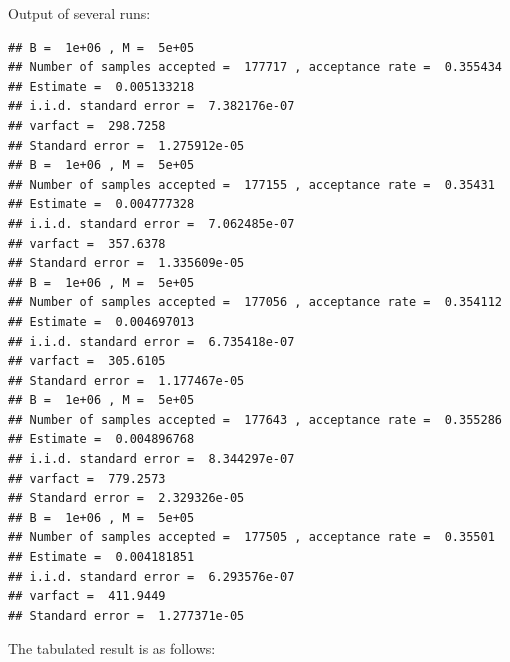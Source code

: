 \begin{knitrout}
\begin{kframe}
\begin{alltt}
\hlstd{(}\hlstd{)}
\hlstd{(}\hlstd{)}
\hlstd{(}\hlstd{)}
\hlstd{(}\hlstd{)}
\hlstd{(}\hlstd{)}
\hlstd{(}\hlstd{)}
\end{alltt}
\end{kframe}
\end{knitrout}
Output of several runs:
\begin{knitrout}
\color{fgcolor}\begin{kframe}
\begin{verbatim}
## B =  1e+06 , M =  5e+05 
## Number of samples accepted =  177717 , acceptance rate =  0.355434 
## Estimate =  0.005133218 
## i.i.d. standard error =  7.382176e-07 
## varfact =  298.7258 
## Standard error =  1.275912e-05
## B =  1e+06 , M =  5e+05 
## Number of samples accepted =  177155 , acceptance rate =  0.35431 
## Estimate =  0.004777328 
## i.i.d. standard error =  7.062485e-07 
## varfact =  357.6378 
## Standard error =  1.335609e-05
## B =  1e+06 , M =  5e+05 
## Number of samples accepted =  177056 , acceptance rate =  0.354112 
## Estimate =  0.004697013 
## i.i.d. standard error =  6.735418e-07 
## varfact =  305.6105 
## Standard error =  1.177467e-05
## B =  1e+06 , M =  5e+05 
## Number of samples accepted =  177643 , acceptance rate =  0.355286 
## Estimate =  0.004896768 
## i.i.d. standard error =  8.344297e-07 
## varfact =  779.2573 
## Standard error =  2.329326e-05
## B =  1e+06 , M =  5e+05 
## Number of samples accepted =  177505 , acceptance rate =  0.35501 
## Estimate =  0.004181851 
## i.i.d. standard error =  6.293576e-07 
## varfact =  411.9449 
## Standard error =  1.277371e-05
\end{verbatim}
\end{kframe}
\end{knitrout}
The tabulated result is as follows:\\
